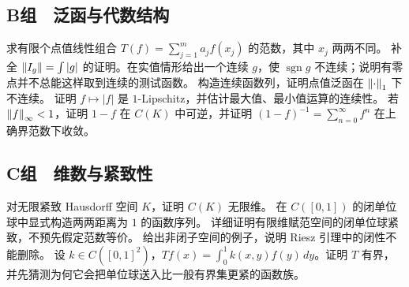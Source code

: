 \subsection*{B组　泛函与代数结构}
\begin{enumerate}[label=\textbf{\thechapter.\arabic*.},resume]
 求有限个点值线性组合 $T(f)=\sum_{j=1}^m a_jf(x_j)$ 的范数，其中 $x_j$
 两两不同。
 补全 $\left\lVert I_g\right\rVert=\int|g|$ 的证明。在实值情形给出一个连续 $g$，使
 $\operatorname{sgn}g$ 不连续；说明有零点并不总能这样取到连续的测试函数。
 构造连续函数列，证明点值泛函在 $\left\lVert\cdot\right\rVert_1$ 下不连续。
 证明 $f\mapsto|f|$ 是 $1$-Lipschitz，并估计最大值、最小值运算的连续性。
 若 $\left\lVert f\right\rVert_\infty<1$，证明 $1-f$ 在 $C(K)$ 中可逆，并证明
 $(1-f)^{-1}=\sum_{n=0}^\infty f^n$ 在上确界范数下收敛。
\end{enumerate}

\subsection*{C组　维数与紧致性}
\begin{enumerate}[label=\textbf{\thechapter.\arabic*.},resume]
 对无限紧致 Hausdorff 空间 $K$，证明 $C(K)$ 无限维。
 在 $C([0,1])$ 的闭单位球中显式构造两两距离为 $1$ 的函数序列。
 详细证明有限维赋范空间的闭单位球紧致，不预先假定范数等价。
 给出非闭子空间的例子，说明 Riesz 引理中的闭性不能删除。
 设 $k\in C([0,1]^2)$，$Tf(x)=\int_0^1k(x,y)f(y)\,dy$。证明 $T$ 有界，
 并先猜测为何它会把单位球送入比一般有界集更紧的函数族。
\end{enumerate}

